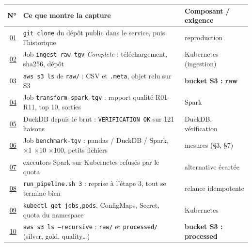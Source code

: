 \documentclass[10pt,a4paper]{article}
\newcommand{\code}[1]{\texttt{\small #1}}
\begin{document}
{\footnotesize
\begin{tabularx}{\linewidth}{@{}r >{\raggedright\arraybackslash}X >{\raggedright\arraybackslash}p{4.3cm}@{}}
\toprule
\textbf{N°} & \textbf{Ce que montre la capture} & \textbf{Composant / exigence} \\
\midrule
\href{https://raw.githubusercontent.com/LouisAmedeo/bigdata_project/main/evidence/01_clone_depot.png}{01} & \code{git clone} du dépôt public dans le service, puis l'historique & reproduction \\
\href{https://raw.githubusercontent.com/LouisAmedeo/bigdata_project/main/evidence/02_ingest_job_logs.png}{02} & Job \code{ingest-raw-tgv} \emph{Complete} : téléchargement, sha256, dépôt & Kubernetes (ingestion) \\
\href{https://raw.githubusercontent.com/LouisAmedeo/bigdata_project/main/evidence/03_s3_raw_listing.png}{03} & \code{aws s3 ls} de \code{raw/} : CSV et \code{.meta}, objet relu sur S3 & \textbf{bucket S3 : raw} \\
\href{https://raw.githubusercontent.com/LouisAmedeo/bigdata_project/main/evidence/04_spark_job_logs.png}{04} & Job \code{transform-spark-tgv} : rapport qualité R01-R11, top 10, sorties & Spark \\
\href{https://raw.githubusercontent.com/LouisAmedeo/bigdata_project/main/evidence/05_duckdb_verification.png}{05} & DuckDB depuis le brut : \code{VERIFICATION OK} sur 121 liaisons & DuckDB, vérification \\
\href{https://raw.githubusercontent.com/LouisAmedeo/bigdata_project/main/evidence/06_benchmark_job.png}{06} & Job \code{benchmark-tgv} : pandas / DuckDB / Spark, ×1 ×10 ×100, petits fichiers & mesures (§3, §7) \\
\href{https://raw.githubusercontent.com/LouisAmedeo/bigdata_project/main/evidence/07_spark_executors_quota.png}{07} & executors Spark sur Kubernetes refusés par le quota & alternative écartée \\
\href{https://raw.githubusercontent.com/LouisAmedeo/bigdata_project/main/evidence/08_relance_run_pipeline.png}{08} & \code{run\_pipeline.sh 3} : reprise à l'étape 3, tout se termine bien & relance idempotente \\
\href{https://raw.githubusercontent.com/LouisAmedeo/bigdata_project/main/evidence/09_kubectl_jobs_quota.png}{09} & \code{kubectl get jobs,pods}, ConfigMaps, Secret, quota du namespace & Kubernetes \\
\href{https://raw.githubusercontent.com/LouisAmedeo/bigdata_project/main/evidence/10_s3_processed_listing.png}{10} & \code{aws s3 ls --recursive} : \code{raw/} et \code{processed/} (silver, gold, quality\ldots) & \textbf{bucket S3 : processed} \\

\end{tabularx}}
\end{document}
